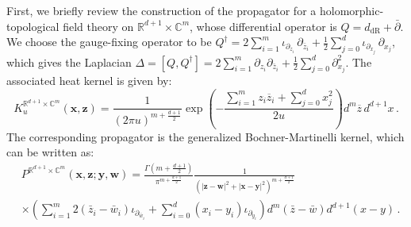 \documentclass[11pt]{article}
\newcommand{\C}{\mathbb{C}}
\newcommand{\R}{\mathbb{R}}
\newcommand{\derham}{\mathrm{dR}}
\numberwithin{equation}{section}
\begin{document}
First, we briefly review the construction of the propagator for a holomorphic-topological field theory on $\R^{d+1}\times\C^m$, whose differential operator is $Q = d_{\derham}+\bar{\partial}$. We choose the gauge-fixing operator to be $Q^{\dagger} = 2 \sum_{i=1}^m\iota_{\partial_{z_i}}\,\partial_{\bar z_i}+\frac12\sum_{j=0}^d\iota_{\partial_{x_j}}\,\partial_{x_j}$, which gives the Laplacian $\Delta = [Q,Q^{\dagger}] = 2 \sum_{i=1}^m\partial_{z_i}\partial_{\bar z_i}+\frac12\sum_{j=0}^d\partial_{x_j}^2$.
The associated heat kernel is given by:
\begin{equation}
K^{\R^{d+1}\times\C^m}_{u}\!(\boldsymbol{x},\boldsymbol{z})
=
\frac{1}{(2\pi u)^{m+\frac{d+1}{2}}}
\exp\left(
-\frac{
\sum_{i=1}^{m} z_i\overline z_i
+
\sum_{j=0}^{d} x_j^2
}{2u}
\right)d^m\overline z\,d^{d+1} x\,.
\end{equation}
The corresponding propagator is the generalized Bochner-Martinelli kernel, which can be written as:
 \begin{equation}
\begin{aligned}
	 	& P^{\R^{d+1}\times\mathbb{C}^m}\!(\boldsymbol{x},\boldsymbol{z};\boldsymbol{y},\boldsymbol{w}) = \frac{\Gamma(m + \frac{d+1}{2})}{\pi^{m+ \frac{d+1}{2}}}\frac{1}{(|\boldsymbol{z} - \boldsymbol{w}|^2 + |\boldsymbol{x}-\boldsymbol{y}|^2)^{m + \frac{d+1}{2}}}\\
	 	&\times \left( \sum_{i = 1}^m2 (\bar{z}_i-\bar{w}_i)\iota_{\partial_{\bar{w}_i}} +  \sum_{i = 0}^{d}(x_i-y_i)\iota_{\partial_{y_i}} \right) d^m(\bar{z} - \bar{w})d^{d+1}(x - y)\,.
\end{aligned}
 \end{equation}
\end{document}
